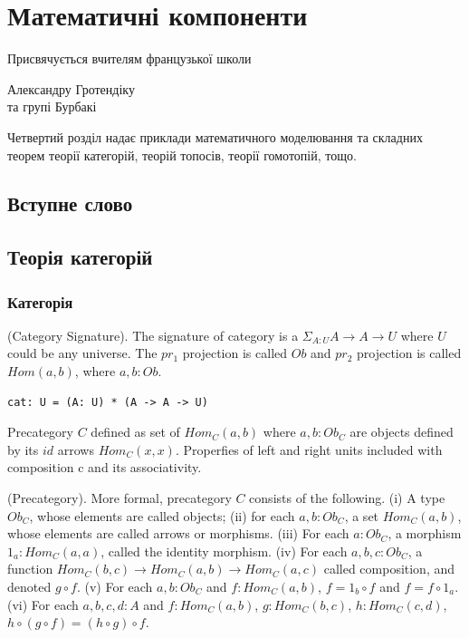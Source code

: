 \chapter{Математичні компоненти}
\epigraph{Присвячується вчителям французької школи}{Александру Гротендіку \\ та групі Бурбакі}

Четвертий розділ надає приклади математичного моделювання
та складних теорем теорії категорій, теорій топосів, теорії гомотопій, тощо.

\section*{Вступне слово}

\section{Теорія категорій}

\subsection{Категорія}

\begin{definition} (Category Signature).
The signature of category is
a $\Sigma_{A:U}A \rightarrow A \rightarrow U$ where $U$ could be any universe.
The $pr_1$ projection is called $Ob$ and $pr_2$ projection is
called $Hom(a,b)$, where $a,b:Ob$.
\begin{lstlisting}
cat: U = (A: U) * (A -> A -> U)
\end{lstlisting}
\end{definition}

Precategory $C$ defined as set of $Hom_C(a,b)$ where $a,b:Ob_C$
are objects defined by its $id$ arrows $Hom_C(x,x)$.
Properfies of left and right units included with composition c
and its associativity.

\begin{definition} (Precategory).
More formal, precategory $C$ consists of the following.
(i) A type $Ob_C$, whose elements are called objects;
(ii) for each $a,b: Ob_C$, a set $Hom_C(a,b)$, whose
elements are called arrows or morphisms.
(iii) For each $a: Ob_C$, a morphism $1_a : Hom_C(a,a)$,
called the identity morphism.
(iv) For each $a,b,c: Ob_C$, a function
$Hom_C(b,c) \rightarrow Hom_C(a,b) \rightarrow Hom_C(a,c)$
called composition, and denoted $g \circ f$.
(v) For each $a,b: Ob_C$ and $f: Hom_C(a,b)$,
$f = 1_b \circ f$ and $f = f \circ 1_a$.
(vi) For each $a,b,c,d: A$ and
$f: Hom_C(a,b)$, $g: Hom_C(b,c)$, $h: Hom_C(c,d)$,
$h \circ (g \circ f ) = (h \circ g) \circ f$.
\end{definition}


